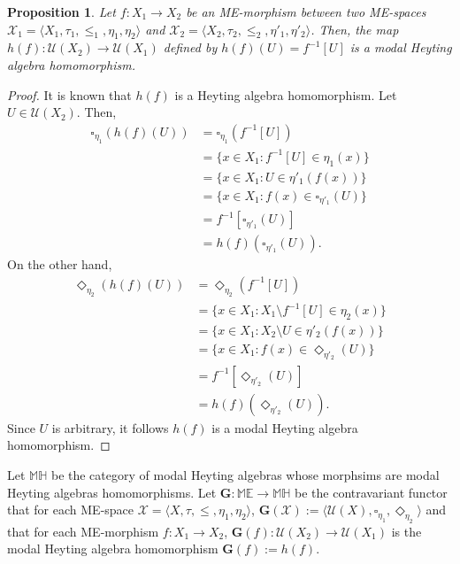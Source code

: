 \documentclass[pdflatex,sn-mathphys-num]{sn-jnl}%
\newcommand{\MH}{\mathbb{MH}}
\theoremstyle{thmstyleone}%
\newtheorem{proposition}[theorem]{Proposition}%
\theoremstyle{thmstyletwo}%
\theoremstyle{thmstylethree}%
\begin{document}
\begin{proposition}
    Let $f \colon X_1\to X_2$ be an ME-morphism	between two ME-spaces $\mathcal{X}_1=\langle X_1,\tau_1,\leq_1,\eta_1,\eta_2\rangle$ and $\mathcal{X}_2=\langle X_2,\tau_2,\leq_2,\eta'_1,\eta'_2\rangle$. Then, the map $h(f) \colon \mathcal{U}(X_2)\to \mathcal{U}(X_1)$ deﬁned by $h(f)(U)=f^{-1}[U]$ is a modal Heyting algebra homomorphism. 
\end{proposition}
\begin{proof}
It is known that $h(f)$ is a Heyting algebra homomorphism. Let $U\in \mathcal{U}(X_2)$. Then,
    \begin{align*}
    \square_{\eta_1}(h(f)(U))&=\square_{\eta_1}(f^{-1}[U])\\&=\{x\in X_1:f^{-1}[U]\in\eta_1(x)\}\\&=\{x\in X_1:U\in\eta'_1(f(x))\}\\&=\{x\in X_1:f(x)\in\square_{\eta'_1}(U)\}\\&=f^{-1}[\square_{\eta'_1}(U)]\\&=h(f)(\square_{\eta'_1}(U)).
    \end{align*}
On the other hand,
    \begin{align*}
        \Diamond_{\eta_2}(h(f)(U))&=\Diamond_{\eta_2}(f^{-1}[U])\\&=\{x\in X_1:X_1\setminus f^{-1}[U]\in\eta_2(x)\}\\&=\{x\in X_1:X_2\setminus U\in\eta'_2(f(x))\}\\&=\{x\in X_1:f(x)\in\Diamond_{\eta'_2}(U)\}\\&=f^{-1}[\Diamond_{\eta'_2}(U)]\\&=h(f)(\Diamond_{\eta'_2}(U)).
    \end{align*}
    Since $U$ is arbitrary, it follows $h(f)$ is a modal Heyting algebra homomorphism.
\end{proof}

Let $\MH$ be the category of modal Heyting algebras whose morphsims are modal Heyting algebras homomorphisms.
Let $\mathbf{G}\colon \mathbb{ME}\to \MH$ be the contravariant functor that for each ME-space $\mathcal{X}=\langle X,\tau,\leq,\eta_1,\eta_2\rangle$, $\mathbf{G}(\mathcal{X}):=\langle \mathcal{U}(X),\square_{\eta_1},\Diamond_{\eta_2}\rangle$ and that for each ME-morphism $f\colon X_1\to X_2$, $\mathbf{G}(f)\colon \mathcal{U}(X_2)\to \mathcal{U}(X_1)$ is the modal Heyting algebra homomorphism $\mathbf{G}(f):=h(f)$.
\end{document}
